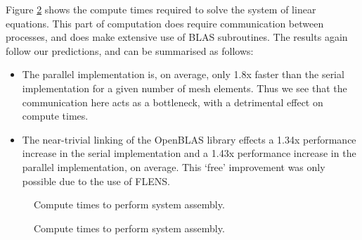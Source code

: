Figure \ref{fig:solver} shows the compute times required to solve the system of linear equations. This part of computation does require communication between processes, and does make extensive use of BLAS subroutines. The results again follow our predictions, and can be summarised as follows:
\begin{itemize}
   \item The parallel implementation is, on average, only 1.8x faster than the serial implementation for a given number of mesh elements. Thus we see that the communication here acts as a bottleneck, with a detrimental effect on compute times. 
   \item The near-trivial linking of the OpenBLAS library effects a 1.34x performance increase in the serial implementation and a 1.43x performance increase in the parallel implementation, on average. This `free' improvement was only possible due to the use of FLENS.
\end{itemize}
\begin{figure}[H]
      \centering
      \newlength\figureheight
      \newlength\figurewidth
      \setlength\figureheight{6cm}
      \setlength\figurewidth{12cm}
      
      \caption{Compute times to perform system assembly.}
      \label{fig:assembly}
\end{figure}
\begin{figure}[H]
      \centering
      \setlength\figureheight{6cm}
      \setlength\figurewidth{12cm}
      
      \caption{Compute times to perform system assembly.}
      \label{fig:solver}
\end{figure}
